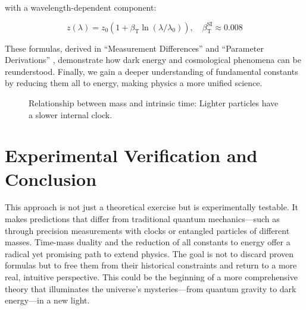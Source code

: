 \documentclass[a4paper,12pt]{article}
\newcommand{\Tfield}{T(x)}
\newcommand{\betaT}{\beta_{\text{T}}}
\begin{document}
	with a wavelength-dependent component:
	
	\begin{equation}
		z(\lambda) = z_0 (1 + \betaT \ln(\lambda/\lambda_0)), \quad \betaT^{\text{SI}} \approx 0.008
	\end{equation}
	
	These formulas, derived in “Measurement Differences” \cite{pascher_messdifferenzen_2025} and “Parameter Derivations” \cite{pascher_params_2025}, demonstrate how dark energy and cosmological phenomena can be reunderstood. Finally, we gain a deeper understanding of fundamental constants by reducing them all to energy, making physics a more unified science.
	
	\begin{figure}[h]
		\centering
		\caption{Relationship between mass and intrinsic time: Lighter particles have a slower internal clock.}
	\end{figure}
	
	\section{Experimental Verification and Conclusion}
	
	This approach is not just a theoretical exercise but is experimentally testable. It makes predictions that differ from traditional quantum mechanics—such as through precision measurements with clocks or entangled particles of different masses. Time-mass duality and the reduction of all constants to energy offer a radical yet promising path to extend physics. The goal is not to discard proven formulas but to free them from their historical constraints and return to a more real, intuitive perspective. This could be the beginning of a more comprehensive theory that illuminates the universe’s mysteries—from quantum gravity to dark energy—in a new light.
	
\end{document}
